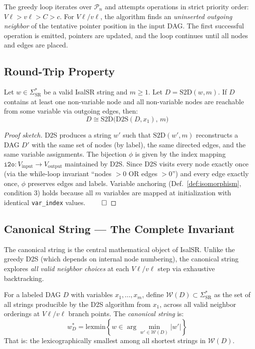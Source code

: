 The greedy loop iterates over $\mathcal{P}_n$ and attempts operations in strict
priority order: $V\ell > v\ell > C > c$. For $V\ell/v\ell$, the algorithm finds
an \emph{uninserted outgoing neighbor} of the tentative pointer position in the
input DAG. The first successful operation is emitted, pointers are updated, and
the loop continues until all nodes and edges are placed.

\subsection{Round-Trip Property}

\begin{theorem}
\label{thm:roundtrip}
Let $w \in \Sigma_{\mathrm{SR}}^*$ be a valid IsalSR string and $m \geq 1$.
Let $D = \text{S2D}(w, m)$. If $D$ contains at least one non-variable node and all
non-variable nodes are reachable from some variable via outgoing edges, then:
\[
  D \cong \text{S2D}\big(\text{D2S}(D, x_1),\, m\big)
\]
\end{theorem}

\begin{proof}[Proof sketch]
D2S produces a string $w'$ such that $\text{S2D}(w', m)$ reconstructs a DAG $D'$
with the same set of nodes (by label), the same directed edges, and the same
variable assignments. The bijection $\phi$ is given by the index mapping
$\texttt{i2o}: V_{\text{input}} \to V_{\text{output}}$ maintained by D2S.
Since D2S visits every node exactly once (via the while-loop invariant
``nodes $> 0$ OR edges $> 0$'') and every edge exactly once, $\phi$ preserves
edges and labels. Variable anchoring (Def.~\ref{def:isomorphism}, condition 3)
holds because all $m$ variables are mapped at initialization with identical
\texttt{var\_index} values. $\qed$
\end{proof}

\subsection{Canonical String --- The Complete Invariant}
\label{sec:canonical}

The canonical string is the central mathematical object of IsalSR.
Unlike the greedy D2S (which depends on internal node numbering), the canonical
string explores \emph{all valid neighbor choices} at each $V\ell/v\ell$ step
via exhaustive backtracking.

\begin{definition}
\label{def:canonical}
For a labeled DAG $D$ with variables $x_1, \ldots, x_m$, define
$\mathcal{W}(D) \subset \Sigma_{\mathrm{SR}}^*$ as the set of all strings producible
by the D2S algorithm from $x_1$, across all valid neighbor orderings at $V\ell/v\ell$
branch points. The \emph{canonical string} is:
\[
  w^*_D = \text{lexmin} \left\{ w \in \arg\min_{w' \in \mathcal{W}(D)} |w'| \right\}
\]
That is: the lexicographically smallest among all shortest strings in $\mathcal{W}(D)$.
\end{definition}

